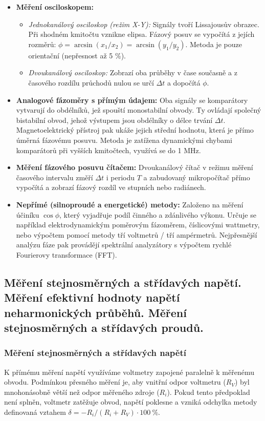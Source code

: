         \begin{itemize}
            \item \textbf{Měření osciloskopem:}
            \begin{itemize}
                \item \textit{Jednokanálový osciloskop (režim X-Y):} Signály tvoří Lissajousův obrazec. Při shodném kmitočtu vznikne elipsa. Fázový posuv se vypočítá z jejích rozměrů: $\phi = \arcsin(x_1/x_2) = \arcsin(y_1/y_2)$. Metoda je pouze orientační (nepřesnost až 5 \%).
                \item \textit{Dvoukanálový osciloskop:} Zobrazí oba průběhy v čase současně a z časového rozdílu průchodů nulou se určí $\Delta t$ a dopočítá $\phi$.
            \end{itemize}
            \item \textbf{Analogové fázoměry s přímým údajem:} Oba signály se komparátory vytvarují do obdélníků, jež spouští monostabilní obvody. Ty ovládají společný bistabilní obvod, jehož výstupem jsou obdélníky o délce trvání $\Delta t$. Magnetoelektrický přístroj pak ukáže jejich střední hodnotu, která je přímo úměrná fázovému posuvu. Metoda je zatížena dynamickými chybami komparátorů při vyšších kmitočtech, využívá se do 1 MHz.
            \item \textbf{Měření fázového posuvu čítačem:} Dvoukanálový čítač v režimu měření časového intervalu změří $\Delta t$ i periodu $T$ a zabudovaný mikropočítač přímo vypočítá a zobrazí fázový rozdíl ve stupních nebo radiánech.
            \item \textbf{Nepřímé (silnoproudé a energetické) metody:} Založeno na měření účiníku $\cos \phi$, který vyjadřuje podíl činného a zdánlivého výkonu. Určuje se například elektrodynamickým poměrovým fázoměrem, číslicovými wattmetry, nebo výpočtem pomocí metody tří voltmetrů / tří ampérmetrů. Nejpřesnější analýzu fáze pak provádějí spektrální analyzátory s výpočtem rychlé Fourierovy transformace (FFT).
        \end{itemize}
\subsection{Měření stejnosměrných a střídavých napětí. Měření efektivní hodnoty napětí neharmonických průběhů. Měření stejnosměrných a střídavých proudů.}
    \subsubsection{Měření stejnosměrných a střídavých napětí}
        K přímému měření napětí využíváme voltmetry zapojené paralelně k měřenému obvodu. Podmínkou přesného měření je, aby vnitřní odpor voltmetru ($R_V$) byl mnohonásobně větší než odpor měřeného zdroje ($R_i$). Pokud tento předpoklad není splněn, voltmetr zatěžuje obvod, napětí poklesne a vzniká odchylka metody definovaná vztahem $\delta = -R_i / (R_i + R_V) \cdot 100\ \%$.
        
